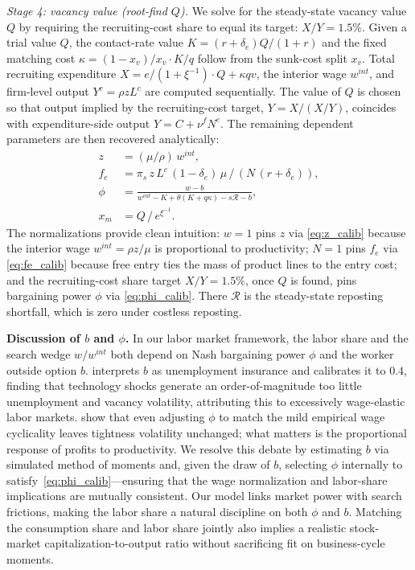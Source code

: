 \documentclass[authoryear, review, 12pt]{elsarticle}
\begin{document}
	\medskip\noindent\textit{Stage 4: vacancy value (root-find $Q$).}
	We solve for the steady-state vacancy value $Q$ by requiring the recruiting-cost
	share to equal its target: $X/Y = 1.5\%$. Given a trial value $Q$, the
	contact-rate value $K=(r+\delta_e)Q/(1+r)$ and the fixed matching cost
	$\kappa=(1-x_v)/x_v \cdot K/q$ follow from the sunk-cost split $x_v$. Total
	recruiting expenditure $X=e/(1+\xi^{-1})\cdot Q+\kappa qv$, the interior
	wage $w^{int}$, and firm-level output $Y^c=\rho z L^c$ are computed
	sequentially. The value of $Q$ is chosen so that output implied by the
	recruiting-cost target, $Y=X/(X/Y)$, coincides with expenditure-side
	output $Y=C+\nu^f N^e$.
	The remaining dependent parameters are then recovered analytically:
	\begin{align}
		z      &= (\mu/\rho)\,w^{int}, \label{eq:z_calib}\\
		f_e    &= \pi_s\, z\, L^c\,(1-\delta_e)\,\mu\,/\,(N\,(r+\delta_e)), \label{eq:fe_calib}\\
		\phi   &= \frac{w-b}{w^{int}-K+\theta(K+q\kappa)-s\mathcal{R}-b}, \label{eq:phi_calib}\\
		x_m    &= Q\,/\,e^{\xi^{-1}}. \label{eq:xm_calib}
	\end{align}
	The normalizations provide clean intuition: $w=1$ pins $z$ via
	\eqref{eq:z_calib} because the interior wage $w^{int}=\rho z/\mu$ is
	proportional to productivity; $N=1$ pins $f_e$ via \eqref{eq:fe_calib}
	because free entry ties the mass of product lines to the entry cost; and the
	recruiting-cost share target $X/Y=1.5\%$, once $Q$ is found, pins bargaining
	power $\phi$ via \eqref{eq:phi_calib}. There $\mathcal{R}$ is the
	steady-state reposting shortfall, which is zero under costless reposting.
	
	\medskip\noindent\textbf{Discussion of $b$ and $\phi$.}
	In our labor market framework, the labor share and the search wedge $w/w^{int}$
	both depend on Nash bargaining power $\phi$ and the worker outside option $b$.
	\citet{shimer_2005} interprets $b$ as unemployment insurance and calibrates it
	to $0.4$, finding that technology shocks generate an order-of-magnitude too
	little unemployment and vacancy volatility, attributing this to excessively
	wage-elastic labor markets. \citet{hagedorn_2008} show that even adjusting $\phi$
	to match the mild empirical wage cyclicality leaves tightness volatility
	unchanged; what matters is the proportional response of profits to productivity.
	We resolve this debate by estimating $b$ via simulated method of moments and, given the draw
	of $b$, selecting $\phi$ internally to satisfy~\eqref{eq:phi_calib}—ensuring
	that the wage normalization and labor-share implications are mutually consistent.
	Our model links market power with search frictions, making the labor share a
	natural discipline on both $\phi$ and $b$. Matching the consumption share and
	labor share jointly also implies a realistic stock-market capitalization-to-output
	ratio without sacrificing fit on business-cycle moments.
	
\end{document}
